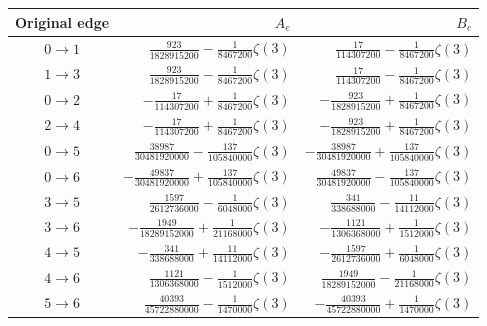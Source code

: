 \begin{center}\small
\begin{tabular}{@{}crr@{}}
\toprule Original edge & $A_e$ & $B_e$ \\ \midrule
$0\to 1$ & $\frac{923}{1828915200}-\frac{1}{8467200}\zeta(3)$ & $\frac{17}{114307200}-\frac{1}{8467200}\zeta(3)$ \\
$1\to 3$ & $\frac{923}{1828915200}-\frac{1}{8467200}\zeta(3)$ & $\frac{17}{114307200}-\frac{1}{8467200}\zeta(3)$ \\
$0\to 2$ & $-\frac{17}{114307200}+\frac{1}{8467200}\zeta(3)$ & $-\frac{923}{1828915200}+\frac{1}{8467200}\zeta(3)$ \\
$2\to 4$ & $-\frac{17}{114307200}+\frac{1}{8467200}\zeta(3)$ & $-\frac{923}{1828915200}+\frac{1}{8467200}\zeta(3)$ \\
$0\to 5$ & $\frac{38987}{30481920000}-\frac{137}{105840000}\zeta(3)$ & $-\frac{38987}{30481920000}+\frac{137}{105840000}\zeta(3)$ \\
$0\to 6$ & $-\frac{49837}{30481920000}+\frac{137}{105840000}\zeta(3)$ & $\frac{49837}{30481920000}-\frac{137}{105840000}\zeta(3)$ \\
$3\to 5$ & $\frac{1597}{2612736000}-\frac{1}{6048000}\zeta(3)$ & $\frac{341}{338688000}-\frac{11}{14112000}\zeta(3)$ \\
$3\to 6$ & $-\frac{1949}{18289152000}+\frac{1}{21168000}\zeta(3)$ & $-\frac{1121}{1306368000}+\frac{1}{1512000}\zeta(3)$ \\
$4\to 5$ & $-\frac{341}{338688000}+\frac{11}{14112000}\zeta(3)$ & $-\frac{1597}{2612736000}+\frac{1}{6048000}\zeta(3)$ \\
$4\to 6$ & $\frac{1121}{1306368000}-\frac{1}{1512000}\zeta(3)$ & $\frac{1949}{18289152000}-\frac{1}{21168000}\zeta(3)$ \\
$5\to 6$ & $\frac{40393}{45722880000}-\frac{1}{1470000}\zeta(3)$ & $-\frac{40393}{45722880000}+\frac{1}{1470000}\zeta(3)$ \\
\bottomrule\end{tabular}\end{center}
